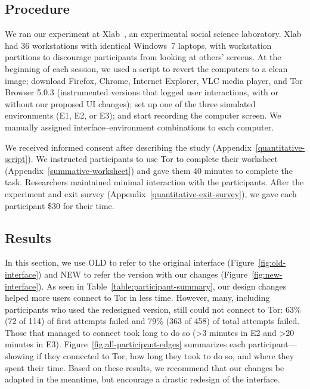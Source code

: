\documentclass[USenglish,oneside,twocolumn]{article}
\begin{document}
\subsection{Procedure}
We ran our experiment at Xlab~\cite{xlab}, an experimental social science laboratory. Xlab had 36 workstations with identical Windows~7 laptops, with workstation partitions to discourage participants from looking at others' screens. At the beginning of each session, we used a script to revert the computers to a clean image; download Firefox, Chrome, Internet Explorer, VLC media player, and Tor Browser 5.0.3 (instrumented versions that logged user interactions, with or without our proposed UI changes); set up one of the three simulated environments (E1, E2, or E3); and start recording the computer screen. We manually assigned interface--environment combinations to each computer.

We received informed consent after describing the study (Appendix~\ref{quantitative-script}). We instructed participants to use Tor to complete their worksheet (Appendix~\ref{summative-worksheet}) and gave them 40 minutes to complete the task. Researchers maintained minimal interaction with the participants. After the experiment and exit survey (Appendix~\ref{quantitative-exit-survey}), we gave each participant \$30 for their time.

\subsection{Results} 
In this section, we use OLD to refer to the original interface (Figure~\ref{fig:old-interface}) and NEW to refer the version with our changes (Figure~\ref{fig:new-interface}). As seen in Table~\ref{table:participant-summary}, our design changes helped more users connect to Tor in less time. However, many, including participants who used the redesigned version, still could not connect to Tor: 63\% (72 of 114) of first attempts failed and 79\% (363 of 458) of total attempts failed. Those that managed to connect took long to do so (>3 minutes in E2 and >20 minutes in E3). Figure~\ref{fig:all-participant-edges} summarizes each participant---showing if they connected to Tor, how long they took to do so, and where they spent their time. Based on these results, we recommend that our changes be adapted in the meantime, but encourage a drastic redesign of the interface.
\end{document}
